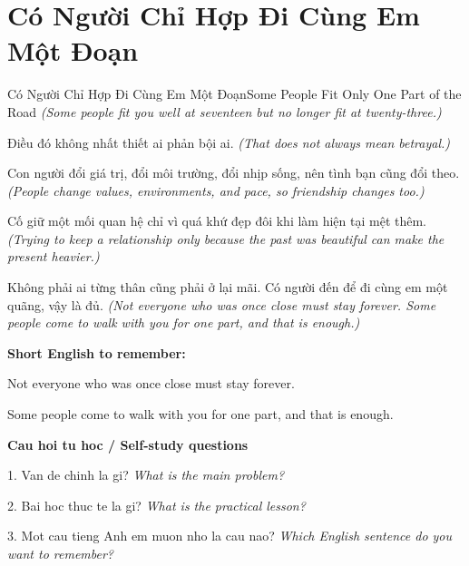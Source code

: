 \section{Có Người Chỉ Hợp Đi Cùng Em Một Đoạn}
\begin{truyen}{Có Người Chỉ Hợp Đi Cùng Em Một Đoạn}{Some People Fit Only One Part of the Road}
\textit{(Some people fit you well at seventeen but no longer fit at twenty-three.)}

Điều đó không nhất thiết ai phản bội ai.
\textit{(That does not always mean betrayal.)}

Con người đổi giá trị, đổi môi trường, đổi nhịp sống, nên tình bạn cũng đổi theo.
\textit{(People change values, environments, and pace, so friendship changes too.)}

Cố giữ một mối quan hệ chỉ vì quá khứ đẹp đôi khi làm hiện tại mệt thêm.
\textit{(Trying to keep a relationship only because the past was beautiful can make the present heavier.)}

\end{truyen}

\begin{baihoc}
Không phải ai từng thân cũng phải ở lại mãi. Có người đến để đi cùng em một quãng, vậy là đủ.
\textit{(Not everyone who was once close must stay forever. Some people come to walk with you for one part, and that is enough.)}
\end{baihoc}

\begin{ghinhoanh}
\textbf{Short English to remember:}

Not everyone who was once close must stay forever.

Some people come to walk with you for one part, and that is enough.

\end{ghinhoanh}

\begin{tuhocnhanh}
\textbf{Cau hoi tu hoc / Self-study questions}

1. Van de chinh la gi? \textit{What is the main problem?}

2. Bai hoc thuc te la gi? \textit{What is the practical lesson?}

3. Mot cau tieng Anh em muon nho la cau nao? \textit{Which English sentence do you want to remember?}
\end{tuhocnhanh}
\ngancach

